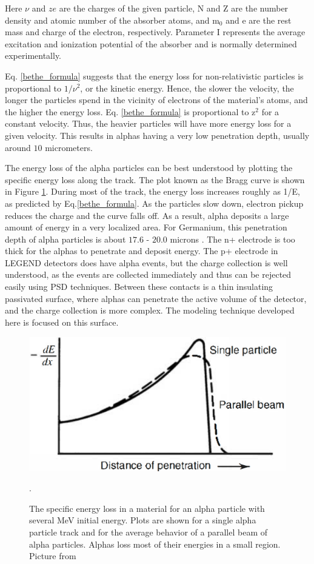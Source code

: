 Here $\nu$ and $ze$ are the charges of the given particle, N and Z are the number density and atomic number of the absorber atoms, and m$_0$ and e are the rest mass and charge of the electron, respectively. Parameter I represents the average excitation and ionization potential of the absorber and is normally determined experimentally. 

Eq. \ref{bethe_formula} suggests that the energy loss for non-relativistic particles is proportional to $1/\nu^2$, or the kinetic energy. Hence, the slower the velocity, the longer the particles spend in the vicinity of electrons of the material's atoms, and the higher the energy loss. Eq. \ref{bethe_formula} is proportional to z$^2$ for a constant velocity. Thus, the heavier particles will have more energy loss for a given velocity. This results in alphas having a very low penetration depth, usually around $10$ micrometers.

The energy loss of the alpha particles can be best understood by plotting the specific energy loss along the track. The plot known as the Bragg curve is shown in Figure \ref{bragg_curve_fig}. During most of the track, the energy loss increases roughly as 1/E, as predicted by Eq.\ref{bethe_formula}. As the particles slow down, electron pickup reduces the charge and the curve falls off. As a result, alpha deposits a large amount of energy in a very localized area. For Germanium, this penetration depth of alpha particles is about $17.6$ - $20.0$ microns \cite{knoll_2010}. The n+ electrode is too thick for the alphas to penetrate and deposit energy. The p+ electrode in LEGEND detectors does have alpha events, but the charge collection is well understood, as the events are collected immediately and thus can be rejected easily using PSD techniques. Between these contacts is a thin insulating passivated surface, where alphas can penetrate the active volume of the detector, and the charge collection is more complex. The modeling technique developed here is focused on this surface.

\begin{figure}
\centering
\includegraphics[width=0.5\linewidth]{ch3/figs/bragg_curve.png}
\caption{The specific energy loss in a material for an alpha particle with several MeV initial energy. Plots are shown for a single alpha particle track and for the average behavior of a parallel beam of alpha particles. Alphas loss most of their energies in a small region. Picture from \cite{knoll_2010}}. 
\label{bragg_curve_fig}
\end{figure}


